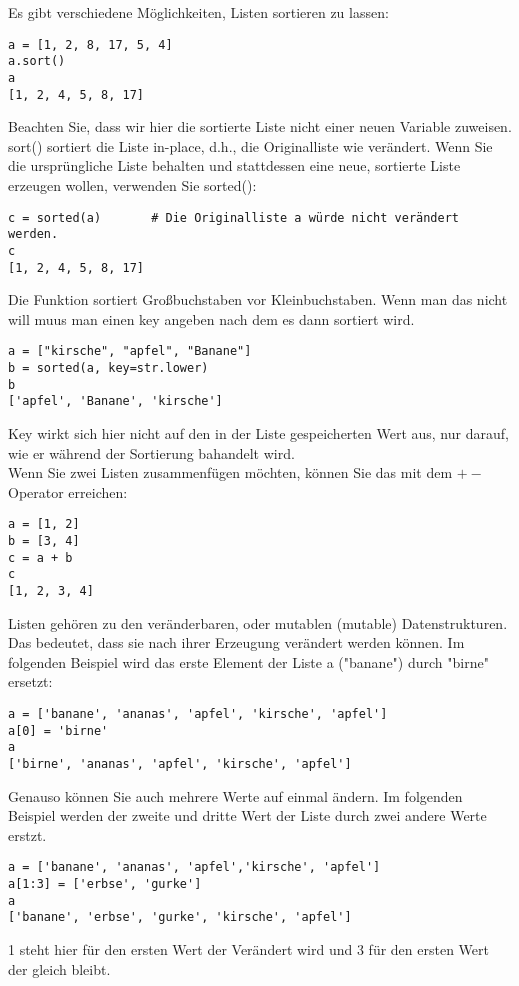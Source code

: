 \documentclass{article}
\begin{document}
Es gibt verschiedene Möglichkeiten, Listen sortieren zu lassen:
\begin{verbatim}
a = [1, 2, 8, 17, 5, 4]
a.sort()
a
[1, 2, 4, 5, 8, 17]
\end{verbatim}
Beachten Sie, dass wir hier die sortierte Liste nicht einer neuen Variable zuweisen. sort() sortiert die Liste in-place, d.h., die Originalliste wie verändert. Wenn Sie die ursprüngliche Liste behalten und stattdessen eine neue, sortierte Liste erzeugen wollen, verwenden Sie sorted():\\
\begin{verbatim}
c = sorted(a)       # Die Originalliste a würde nicht verändert werden.
c
[1, 2, 4, 5, 8, 17]
\end{verbatim}
Die Funktion sortiert Großbuchstaben vor Kleinbuchstaben. Wenn man das nicht will muus man einen key angeben nach dem es dann sortiert wird.
\begin{verbatim}
a = ["kirsche", "apfel", "Banane"]
b = sorted(a, key=str.lower)
b
['apfel', 'Banane', 'kirsche']
\end{verbatim}
Key wirkt sich hier nicht auf den in der Liste gespeicherten Wert aus, nur darauf, wie er während der Sortierung bahandelt wird.\\
Wenn Sie zwei Listen zusammenfügen möchten, können Sie das mit dem $+-$ Operator erreichen:
\begin{verbatim}
a = [1, 2]
b = [3, 4]
c = a + b
c
[1, 2, 3, 4]
\end{verbatim}
Listen gehören zu den veränderbaren, oder mutablen (mutable) Datenstrukturen. Das bedeutet, dass sie nach ihrer Erzeugung verändert werden können. Im folgenden Beispiel wird das erste Element der Liste a ("banane") durch "birne" ersetzt:
\begin{verbatim}
a = ['banane', 'ananas', 'apfel', 'kirsche', 'apfel']
a[0] = 'birne'
a
['birne', 'ananas', 'apfel', 'kirsche', 'apfel']
\end{verbatim}
Genauso können Sie auch mehrere Werte auf einmal ändern. Im folgenden Beispiel werden der zweite und dritte Wert der Liste durch zwei andere Werte erstzt.\\
\begin{verbatim}
a = ['banane', 'ananas', 'apfel','kirsche', 'apfel']
a[1:3] = ['erbse', 'gurke']
a
['banane', 'erbse', 'gurke', 'kirsche', 'apfel']
\end{verbatim}
1 steht hier für den ersten Wert der Verändert wird und 3 für den ersten Wert der gleich bleibt.\\
\end{document}
